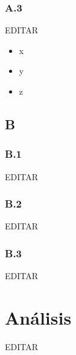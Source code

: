 \documentclass[preprint,12pt]{elsarticle}
\begin{document}
\subsubsection{\textbf{A.3}}

EDITAR

\begin{itemize}

\item x
\item y
\item z

\end{itemize}


\subsection{\textbf{B}}

\subsubsection{\textbf{B.1}}

EDITAR

\subsubsection{\textbf{B.2}}	

EDITAR

\subsubsection{\textbf{B.3}}	

EDITAR





\section{Análisis}

EDITAR



\end{document}

